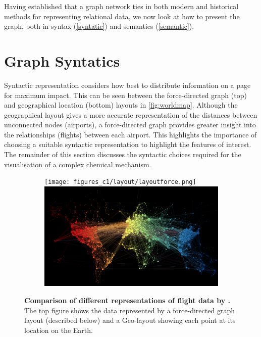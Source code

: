 Having established that a graph network ties in both modern and historical methods for representing relational data, we now look at how to present the graph, both in syntax (\autoref{syntatic}) and semantics (\autoref{semantic}). 



\section{Graph Syntatics}\label{syntatic}

 Syntactic representation considers how best to distribute information on a page for maximum impact. This can be seen between the force-directed graph (top) and geographical location (bottom) layouts in \autoref{fig:worldmap}. Although the geographical layout gives a more accurate representation of the distances between unconnected nodes (airports), a force-directed graph provides greater insight into the relationships (flights) between each airport. This highlights the importance of choosing a suitable syntactic representation to highlight the features of interest. The remainder of this section discusses the syntactic choices required for the visualisation of a complex chemical mechanism. 

 
\begin{figure}[H]
     \centering 
      \begin{subfigure}[b,black]{.9\textwidth}
         \centering 
     \texttt{[image: figures\_c1/layout/layoutforce.png]}
     \includegraphics[width=\textwidth]{figures_c1/layout/layoutgeo.png}
     \end{subfigure}
        \caption{\textbf{Comparison of different representations of flight data by \citep{worldmap}.} The top figure shows the data represented by a force-directed graph layout (described below) and a Geo-layout showing each point at its location on the Earth.}
        \label{fig:worldmap}
\end{figure}


